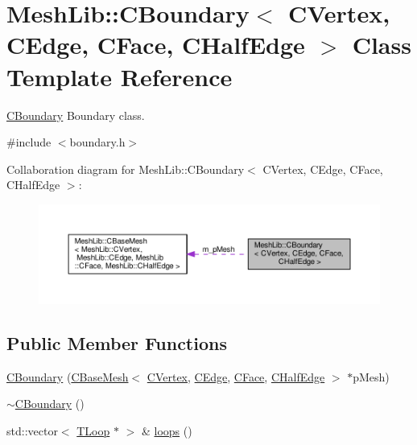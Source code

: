 \hypertarget{class_mesh_lib_1_1_c_boundary}{}\section{Mesh\+Lib\+:\+:C\+Boundary$<$ C\+Vertex, C\+Edge, C\+Face, C\+Half\+Edge $>$ Class Template Reference}
\label{class_mesh_lib_1_1_c_boundary}


\hyperlink{class_mesh_lib_1_1_c_boundary}{C\+Boundary} Boundary class.  




{\ttfamily \#include $<$boundary.\+h$>$}



Collaboration diagram for Mesh\+Lib\+:\+:C\+Boundary$<$ C\+Vertex, C\+Edge, C\+Face, C\+Half\+Edge $>$\+:
\nopagebreak
\begin{figure}[H]
\begin{center}
\leavevmode
\includegraphics[width=350pt]{class_mesh_lib_1_1_c_boundary__coll__graph}
\end{center}
\end{figure}
\subsection*{Public Member Functions}
\begin{DoxyCompactItemize}
\item 
\hyperlink{class_mesh_lib_1_1_c_boundary_ae8f0ae5dcbd7083268dd22b4db773c88}{C\+Boundary} (\hyperlink{class_mesh_lib_1_1_c_base_mesh}{C\+Base\+Mesh}$<$ \hyperlink{class_mesh_lib_1_1_c_vertex}{C\+Vertex}, \hyperlink{class_mesh_lib_1_1_c_edge}{C\+Edge}, \hyperlink{class_mesh_lib_1_1_c_face}{C\+Face}, \hyperlink{class_mesh_lib_1_1_c_half_edge}{C\+Half\+Edge} $>$ $\ast$p\+Mesh)
\item 
\hyperlink{class_mesh_lib_1_1_c_boundary_ac46449d5cb6708f2da90a2314ae1e9ba}{$\sim$\+C\+Boundary} ()
\item 
std\+::vector$<$ \hyperlink{class_mesh_lib_1_1_c_loop}{T\+Loop} $\ast$ $>$ \& \hyperlink{class_mesh_lib_1_1_c_boundary_aa71cb8a6d3f8107da8dad93523da97db}{loops} ()
\end{DoxyCompactItemize}
